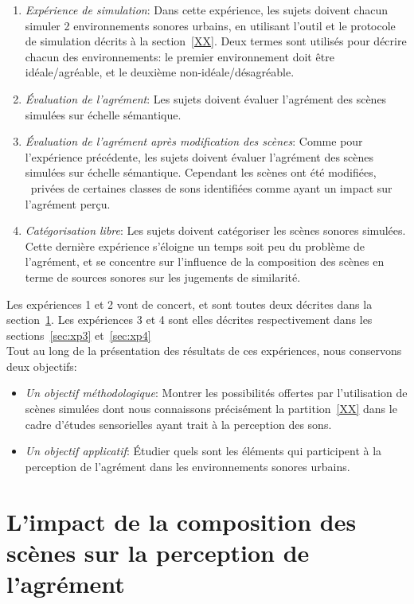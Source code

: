 \begin{enumerate}
\item \emph{Expérience de simulation}: Dans cette expérience, les sujets doivent chacun simuler 2 environnements sonores urbains, en utilisant l'outil et le protocole de simulation décrits à la section~\ref{XX}. Deux termes sont utilisés pour décrire chacun des environnements: le premier environnement doit être idéale/agréable, et le deuxième non-idéale/désagréable.
\item \emph{Évaluation de l'agrément}: Les sujets doivent évaluer l'agrément des scènes simulées sur échelle sémantique.
\item \emph{Évaluation de l'agrément après modification des scènes}: Comme pour l'expérience précédente, les sujets doivent évaluer l'agrément des scènes simulées sur échelle sémantique. Cependant les scènes ont été modifiées, \ie~privées de certaines classes de sons identifiées comme ayant un impact sur l'agrément perçu. 
\item \emph{Catégorisation libre}: Les sujets doivent catégoriser les scènes sonores simulées. Cette dernière expérience s'éloigne un temps soit peu du problème de l'agrément, et se concentre sur l'influence de la composition des scènes en terme de sources sonores sur les jugements de similarité. 
\end{enumerate}

Les expériences 1 et 2 vont de concert, et sont toutes deux décrites dans la section~\ref{sec:xp1_2}. Les expériences 3 et 4 sont elles décrites respectivement dans les sections~\ref{sec:xp3} et~\ref{sec:xp4}  \\

Tout au long de la présentation des résultats de ces expériences, nous conservons deux objectifs:

\begin{itemize}
\item \emph{Un objectif méthodologique}: Montrer les possibilités offertes par l'utilisation de scènes simulées  dont nous connaissons précisément la partition~\ref{XX} dans le cadre d'études sensorielles ayant trait à la perception des sons.
\item \emph{Un objectif applicatif}: Étudier quels sont les éléments qui participent à la perception de l'agrément dans les environnements sonores urbains. 
\end{itemize}

\section{L'impact de la composition des scènes sur la perception de l'agrément}
\label{sec:xp1_2}

